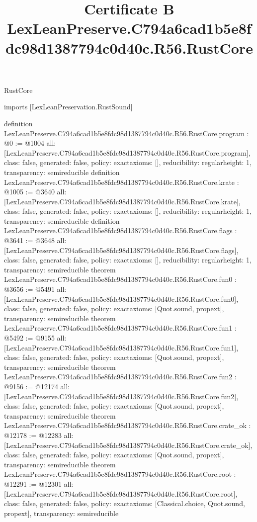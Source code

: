 \begin{lexlean}{RustCore}
\title{Certificate B LexLeanPreserve.C794a6cad1b5e8fdc98d1387794c0d40c.R56.RustCore}
\begin{coremodule}
imports [LexLeanPreservation.RustSound]

definition LexLeanPreserve.C794a6cad1b5e8fdc98d1387794c0d40c.R56.RustCore.program : @0 := @1004 {
  all: [LexLeanPreserve.C794a6cad1b5e8fdc98d1387794c0d40c.R56.RustCore.program],
  class: false,
  generated: false,
  policy: exact{axioms: []},
  reducibility: regular{height: 1},
  transparency: semireducible
}
definition LexLeanPreserve.C794a6cad1b5e8fdc98d1387794c0d40c.R56.RustCore.krate : @1005 := @3640 {
  all: [LexLeanPreserve.C794a6cad1b5e8fdc98d1387794c0d40c.R56.RustCore.krate],
  class: false,
  generated: false,
  policy: exact{axioms: []},
  reducibility: regular{height: 1},
  transparency: semireducible
}
definition LexLeanPreserve.C794a6cad1b5e8fdc98d1387794c0d40c.R56.RustCore.flags : @3641 := @3648 {
  all: [LexLeanPreserve.C794a6cad1b5e8fdc98d1387794c0d40c.R56.RustCore.flags],
  class: false,
  generated: false,
  policy: exact{axioms: []},
  reducibility: regular{height: 1},
  transparency: semireducible
}
theorem LexLeanPreserve.C794a6cad1b5e8fdc98d1387794c0d40c.R56.RustCore.fun0 : @3656 := @5491 {
  all: [LexLeanPreserve.C794a6cad1b5e8fdc98d1387794c0d40c.R56.RustCore.fun0],
  class: false,
  generated: false,
  policy: exact{axioms: [Quot.sound, propext]},
  transparency: semireducible
}
theorem LexLeanPreserve.C794a6cad1b5e8fdc98d1387794c0d40c.R56.RustCore.fun1 : @5492 := @9155 {
  all: [LexLeanPreserve.C794a6cad1b5e8fdc98d1387794c0d40c.R56.RustCore.fun1],
  class: false,
  generated: false,
  policy: exact{axioms: [Quot.sound, propext]},
  transparency: semireducible
}
theorem LexLeanPreserve.C794a6cad1b5e8fdc98d1387794c0d40c.R56.RustCore.fun2 : @9156 := @12174 {
  all: [LexLeanPreserve.C794a6cad1b5e8fdc98d1387794c0d40c.R56.RustCore.fun2],
  class: false,
  generated: false,
  policy: exact{axioms: [Quot.sound, propext]},
  transparency: semireducible
}
theorem LexLeanPreserve.C794a6cad1b5e8fdc98d1387794c0d40c.R56.RustCore.crate_ok : @12178 := @12283 {
  all: [LexLeanPreserve.C794a6cad1b5e8fdc98d1387794c0d40c.R56.RustCore.crate_ok],
  class: false,
  generated: false,
  policy: exact{axioms: [Quot.sound, propext]},
  transparency: semireducible
}
theorem LexLeanPreserve.C794a6cad1b5e8fdc98d1387794c0d40c.R56.RustCore.root : @12291 := @12301 {
  all: [LexLeanPreserve.C794a6cad1b5e8fdc98d1387794c0d40c.R56.RustCore.root],
  class: false,
  generated: false,
  policy: exact{axioms: [Classical.choice, Quot.sound, propext]},
  transparency: semireducible
}


\end{coremodule}
\end{lexlean}
